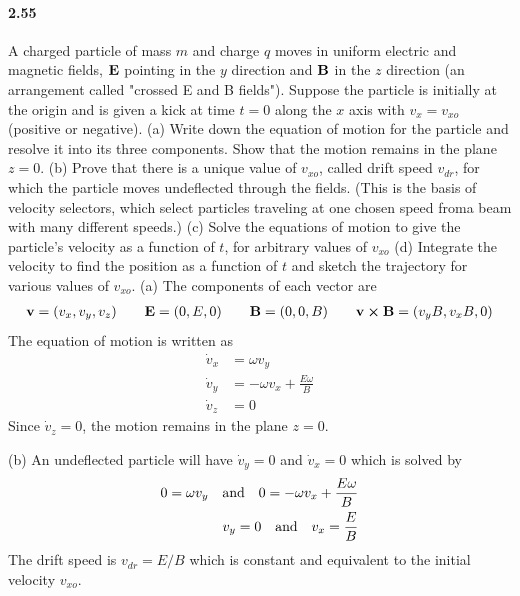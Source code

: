 \documentclass[../problems.tex]{subfiles}
\begin{document}
\paragraph{2.55} A charged particle of mass $m$ and charge $q$ moves in uniform electric and
magnetic fields, $\vb{E}$ pointing in the $y$ direction and $\vb{B}$ in the $z$ direction (an 
arrangement called "crossed E and B fields"). Suppose the particle is initially at the origin and is
given a kick at time $t = 0$ along the $x$ axis with $v_x = v_{xo}$ (positive or negative). (a) Write
down the equation of motion for the particle and resolve it into its three components. Show that the
motion remains in the plane $z = 0$. (b) Prove that there is a unique value of $v_{xo}$, called
drift speed $v_{dr}$, for which the particle moves undeflected through the fields. (This is the
basis of velocity selectors, which select particles traveling at one chosen speed froma beam with
many different speeds.) (c) Solve the equations of motion to give the particle's velocity as a
function of $t$, for arbitrary values of $v_{xo}$ (d) Integrate the velocity to find the position as
a function of $t$ and sketch the trajectory for various values of $v_{xo}$.
\barh 
(a) The components of each vector are
\begin{align*}
    \vb{v} = (v_x,v_y,v_z) \qquad \vb{E} = (0,E,0) \qquad \vb{B} = (0,0,B)
        \qquad \vb{v}\cp\vb{B} = (v_yB, v_xB, 0)
\end{align*}
The equation of motion is written as
\begin{align*}
    \dot{v}_x &= \omega v_y \\
    \dot{v}_y &= -\omega v_x + \frac{E\omega}{B} \\
    \dot{v}_z &= 0
\end{align*}
Since $\dot{v}_z = 0$, the motion remains in the plane $z = 0$.

(b) An undeflected particle will have $\dot{v}_y = 0$ and $\dot{v}_x = 0$ which is solved by
\begin{align*}
    0 = \omega v_y \qand 0 = -\omega v_x + \frac{E\omega}{B} \\
    v_y = 0 \qand v_x = \frac{E}{B}
\end{align*}
The drift speed is $v_{dr} = E/B$ which is constant and equivalent to the initial velocity $v_{xo}$.
\end{document}
